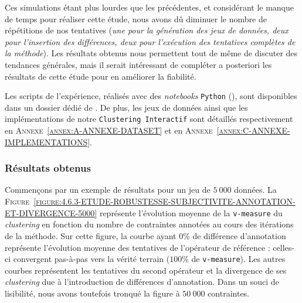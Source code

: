 			\begin{leftBarWarning}
				Ces simulations étant plus lourdes que les précédentes, et considérant le manque de temps pour réaliser cette étude, nous avons dû diminuer le nombre de répétitions de nos tentatives (\textit{une pour la génération des jeux de données, deux pour l'insertion des différences, deux pour l'exécution des tentatives complètes de la méthode}).
				Les résultats obtenus nous permettent tout de même de discuter des tendances générales, mais il serait intéressant de compléter a posteriori les résultats de cette étude pour en améliorer la fiabilité.
			\end{leftBarWarning}
			
			\begin{leftBarReminder}
				Les scripts de l'expérience, réalisés avec des \textit{notebooks} \texttt{Python} (\cite{van-rossum-drake:2009:python-reference-manual}), sont disponibles dans un dossier dédié de \cite{schild:2021:cognitivefactory-interactiveclusteringcomparativestudy}.
				De plus, les jeux de données ainsi que les implémentations de notre \texttt{Clustering Interactif} sont détaillés respectivement en \textsc{Annexe~\ref{annex:A-ANNEXE-DATASET}} et en \textsc{Annexe~\ref{annex:C-ANNEXE-IMPLEMENTATIONS}}.
			\end{leftBarReminder}
		
		
		\subsubsection{Résultats obtenus}
			
			Commençons par un exemple de résultats pour un jeu de $5~000$ données.
			La \textsc{Figure~\ref{figure:4.6.3-ETUDE-ROBUSTESSE-SUBJECTIVITE-ANNOTATION-ET-DIVERGENCE-5000}} représente l'évolution moyenne de la \texttt{v-measure} du \textit{clustering} en fonction du nombre de contraintes annotées au cours des itérations de la méthode.
			Sur cette figure, la courbe ayant $0$\% de différence d'annotation représente l'évolution moyenne des tentatives de l'opérateur de référence : celles-ci convergent pas-à-pas vers la vérité terrain ($100$\% de \texttt{v-measure}).
			Les autres courbes représentent les tentatives du second opérateur et la divergence de ses \textit{clustering} due à l'introduction de différences d'annotation.
			Dans un souci de lisibilité, nous avons toutefois tronqué la figure à $50~000$ contraintes.

